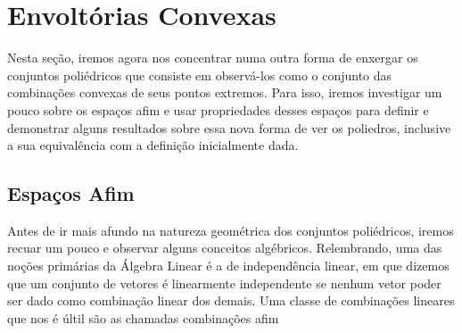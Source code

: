 \newtheorem{def:convex hull}[def:conjunto convexo]{Definição}
\newtheorem{def:independencia convexa}[def:conjunto convexo]{Definição}
\newtheorem{def:simplex}[def:conjunto convexo]{Definição}
\newtheorem{def:combinação afim}[def:conjunto convexo]{Definição}
\newtheorem{def:perfil}[def:conjunto convexo]{Definição}


\newtheorem{prop:redundancia}[prop:combinação convexa]{Proposição}
\newtheorem{prop:pontos extremos na fronteira}[prop:combinação convexa]{Proposição}
\newtheorem{prop:conjuntos convexos fechados}[prop:combinação convexa]{Proposição}
\newtheorem{prop:conjuntos convexos limitados}[prop:combinação convexa]{Proposição}

\newtheorem{lemma:afim}{Lema}[chapter]
\newtheorem{lemma:dentro ou fora}{Lema}[chapter]

\newtheorem{thm:caratheodory}{Teorema}[chapter]
\newtheorem{thm:conjuntos convexos compactos}[thm:caratheodory]{Teorema}

\newtheorem{cor:redundancia}{Corolário}[chapter]
\newtheorem{cor:caratheodory}{Corolário}[chapter]

\section{Envoltórias Convexas}

Nesta seção, iremos agora nos concentrar numa outra forma de enxergar os
conjuntos poliédricos que consiste em observá-los como o conjunto das
combinações convexas de seus pontos extremos.
Para isso, iremos investigar um pouco sobre os espaços afim e usar propriedades desses espaços para definir e demonstrar alguns resultados sobre essa nova
forma de ver os poliedros, inclusive a sua equivalência com a definição
inicialmente dada.

\subsection{Espaços Afim}

Antes de ir mais afundo na natureza geométrica dos conjuntos
poliédricos, iremos recuar um pouco e observar alguns conceitos
algébricos. Relembrando, uma das noções primárias da Álgebra Linear é a de
independência linear, em que dizemos que um conjunto de vetores
é linearmente independente se nenhum vetor poder ser dado
como combinação linear dos demais. Uma classe de combinações
lineares que nos é últil são as chamadas combinações afim

